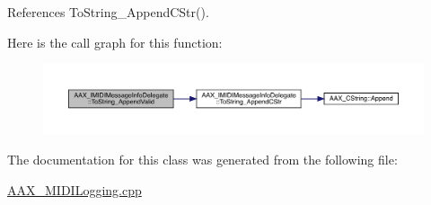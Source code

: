 References To\+String\+\_\+\+Append\+C\+Str().

Here is the call graph for this function\+:
\nopagebreak
\begin{figure}[H]
\begin{center}
\leavevmode
\includegraphics[width=350pt]{a01953_acf29d3b4be3defe93bb3fad8dda3e7ea_cgraph}
\end{center}
\end{figure}


The documentation for this class was generated from the following file\+:\begin{DoxyCompactItemize}
\item 
\mbox{\hyperlink{a00734}{A\+A\+X\+\_\+\+M\+I\+D\+I\+Logging.\+cpp}}\end{DoxyCompactItemize}
